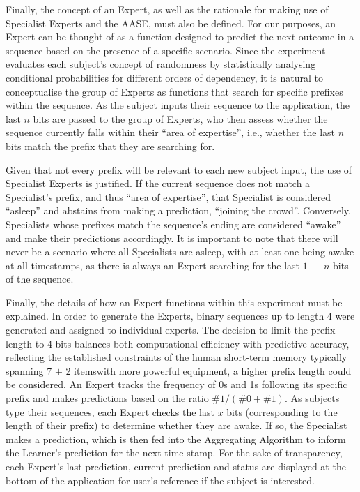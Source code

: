Finally, the concept of an Expert, as well as the rationale for making use of Specialist Experts and the AASE, must also be defined. For our purposes, an Expert can be thought of as a function designed to predict the next outcome in a sequence based on the presence of a specific scenario. Since the experiment evaluates each subject's concept of randomness by statistically analysing conditional probabilities for different orders of dependency, it is natural to conceptualise the group of Experts as functions that search for specific prefixes within the sequence. As the subject inputs their sequence to the application, the last $n$ bits are passed to the group of Experts, who then assess whether the sequence currently falls within their ``area of expertise'', i.e., whether the last $n$ bits match the prefix that they are searching for.

Given that not every prefix will be relevant to each new subject input, the use of Specialist Experts is justified. If the current sequence does not match a Specialist's prefix, and thus ``area of expertise'', that Specialist is considered ``asleep'' and abstains from making a prediction, ``joining the crowd''. Conversely, Specialists whose prefixes match the sequence's ending are considered ``awake'' and make their predictions accordingly. It is important to note that there will never be a scenario where all Specialists are asleep, with at least one being awake at all timestamps, as there is always an Expert searching for the last $1\ -\ n$ bits of the sequence.

Finally, the details of how an Expert functions within this experiment must be explained. In order to generate the Experts, binary sequences up to length $4$ were generated and assigned to individual experts. The decision to limit the prefix length to 4-bits balances both computational efficiency with predictive accuracy, reflecting the established constraints of the human short-term memory typically spanning 7 $\pm$ 2 items\textemdash{}with more powerful equipment, a higher prefix length could be considered. An Expert tracks the frequency of 0s and 1s following its specific prefix and makes predictions based on the ratio $\#1 / (\#0 + \#1)$. As subjects type their sequences, each Expert checks the last $x$ bits (corresponding to the length of their prefix) to determine whether they are awake. If so, the Specialist makes a prediction, which is then fed into the Aggregating Algorithm to inform the Learner's prediction for the next time stamp. For the sake of transparency, each Expert's last prediction, current prediction and status are displayed at the bottom of the application for user's reference if the subject is interested.

